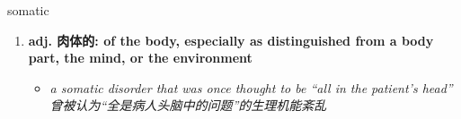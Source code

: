 
\begin{frame}
{\huge somatic}
\begin{center}
\begin{enumerate}\Large
  \item \textbf{adj. 肉体的: of the body, especially as distinguished from a body part, the mind, or the environment}
  \begin{itemize}
    \item \em{\Large{a somatic disorder that was once thought to be “all in the patient’s head” 曾被认为“全是病人头脑中的问题”的生理机能紊乱}}
  \end{itemize}
\end{enumerate}
\end{center}
\end{frame}
